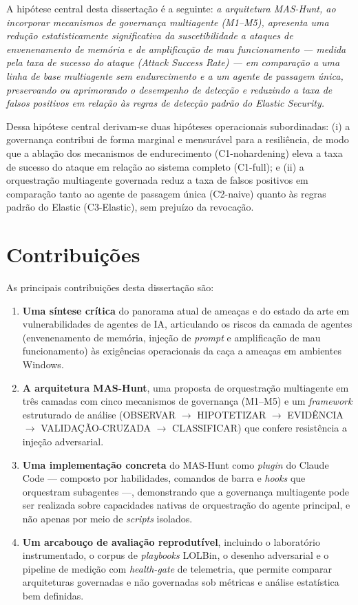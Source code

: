 A hipótese central desta dissertação é a seguinte: \emph{a arquitetura MAS-Hunt,
ao incorporar mecanismos de governança multiagente (M1--M5), apresenta uma
redução estatisticamente significativa da suscetibilidade a ataques de
envenenamento de memória e de amplificação de mau funcionamento — medida pela
taxa de sucesso do ataque (\emph{Attack Success Rate}) — em comparação a uma
linha de base multiagente sem endurecimento e a um agente de passagem única,
preservando ou aprimorando o desempenho de detecção e reduzindo a taxa de falsos
positivos em relação às regras de detecção padrão do Elastic Security.}

Dessa hipótese central derivam-se duas hipóteses operacionais subordinadas: (i) a
governança contribui de forma marginal e mensurável para a resiliência, de modo
que a ablação dos mecanismos de endurecimento (C1-nohardening) eleva a taxa de
sucesso do ataque em relação ao sistema completo (C1-full); e (ii) a orquestração
multiagente governada reduz a taxa de falsos positivos em comparação tanto ao
agente de passagem única (C2-naive) quanto às regras padrão do Elastic
(C3-Elastic), sem prejuízo da revocação.

\section{Contribuições}
\label{sec:contribuicoes}

As principais contribuições desta dissertação são:

\begin{enumerate}
  \item \textbf{Uma síntese crítica} do panorama atual de ameaças e do
  estado da arte em vulnerabilidades de agentes de IA, articulando os riscos da
  camada de agentes (envenenamento de memória, injeção de \emph{prompt} e
  amplificação de mau funcionamento) às exigências operacionais da caça a
  ameaças em ambientes Windows.

  \item \textbf{A arquitetura MAS-Hunt}, uma proposta de orquestração multiagente
  em três camadas com cinco mecanismos de governança (M1--M5) e um
  \emph{framework} estruturado de análise (OBSERVAR $\rightarrow$ HIPOTETIZAR
  $\rightarrow$ EVIDÊNCIA $\rightarrow$ VALIDAÇÃO-CRUZADA $\rightarrow$
  CLASSIFICAR) que confere resistência a injeção adversarial.

  \item \textbf{Uma implementação concreta} do MAS-Hunt como \emph{plugin} do
  Claude Code — composto por habilidades, comandos de barra e \emph{hooks} que
  orquestram subagentes —, demonstrando que a governança multiagente pode ser
  realizada sobre capacidades nativas de orquestração do agente principal, e não
  apenas por meio de \emph{scripts} isolados.

  \item \textbf{Um arcabouço de avaliação reprodutível}, incluindo o laboratório
  instrumentado, o corpus de \emph{playbooks} LOLBin, o desenho adversarial e o
  pipeline de medição com \emph{health-gate} de telemetria, que permite comparar
  arquiteturas governadas e não governadas sob métricas e análise estatística
  bem definidas.
\end{enumerate}

